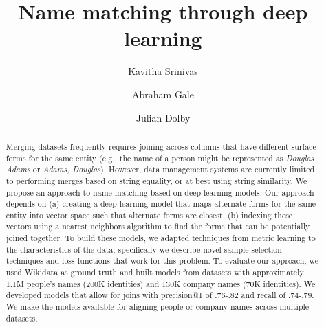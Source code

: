 \documentclass[runningheads]{llncs}
\begin{document}
%
\title{Name matching through deep learning}
%
%
\author{Kavitha Srinivas \and
Abraham Gale \and
Julian Dolby}
%
%

%
\maketitle              %
%
\begin{abstract}
Merging datasets frequently requires joining across columns that have
different surface forms for the same entity (e.g., the name of a
person might be represented as \textit{Douglas Adams} or
\textit{Adams, Douglas}).  However, data management systems are currently limited
to performing merges based on string equality, or at best using
string similarity.  We propose an approach to name matching based on deep learning models.  
Our approach depends on (a) creating
a deep learning model that maps alternate forms for the same entity into vector space such that alternate forms are closest, (b) indexing these vectors using a nearest
neighbors algorithm to find the forms that can be potentially joined
together.  To build these models, we adapted techniques from
metric learning to the characteristics of the data; specifically we describe 
novel sample selection techniques and loss functions that work for this problem.  
To evaluate our approach, we used Wikidata as ground truth
and built models from datasets with approximately 1.1M people's names
(200K identities) and 130K company names (70K identities).  We developed models that 
allow for joins with precision@1 of .76-.82 and
recall of .74-.79.  We make the models available for aligning people or company names across multiple datasets.  

\end{abstract}
%
%
%








%
%
%


 
\end{document}
